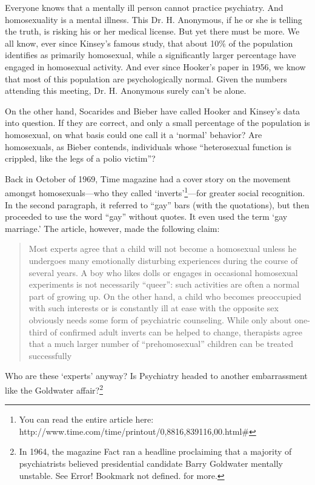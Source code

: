 Everyone knows that a mentally ill person cannot practice psychiatry. And homosexuality is a mental illness. This Dr. H. Anonymous, if he or she is telling the truth, is risking his or her medical license. But yet there must be more. We all know, ever since Kinsey's famous study, that about 10\% of the population identifies as primarily homosexual, while a significantly larger percentage have engaged in homosexual activity. And ever since Hooker's paper in 1956, we know that most of this population are psychologically normal. Given the numbers attending this meeting, Dr. H. Anonymous surely can't be alone.

On the other hand, Socarides and Bieber have called Hooker and Kinsey's data into question. If they are correct, and only a small percentage of the population is homosexual, on what basis could one call it a `normal' behavior? Are homosexuals, as Bieber contends, individuals whose “heterosexual function is crippled, like the legs of a polio victim”? 

Back in October of 1969, Time magazine had a cover story on the movement amongst homosexuals---who they called `inverts'\footnote{You can read the entire article here: http:\slash \slash www.time.com\slash time\slash printout\slash 0,8816,839116,00.html\#}---for greater social recognition. In the second paragraph, it referred to “gay” bars (with the quotations), but then proceeded to use the word “gay” without quotes. It even used the term `gay marriage.' The article, however, made the following claim:

\begin{quote}

Most experts agree that a child will not become a homosexual unless he undergoes many emotionally disturbing experiences during the course of several years. A boy who likes dolls or engages in occasional homosexual experiments is not necessarily ``queer'': such activities are often a normal part of growing up. On the other hand, a child who becomes preoccupied with such interests or is constantly ill at ease with the opposite sex obviously needs some form of psychiatric counseling. While only about one-third of confirmed adult inverts can be helped to change, therapists agree that a much larger number of ``prehomosexual'' children can be treated successfully
\end{quote}

Who are these `experts' anyway? Is Psychiatry headed to another embarrassment like the Goldwater affair?\footnote{In 1964, the magazine Fact ran a headline proclaiming that a majority of psychiatrists believed presidential candidate Barry Goldwater mentally unstable. See Error! Bookmark not defined. for more.}

